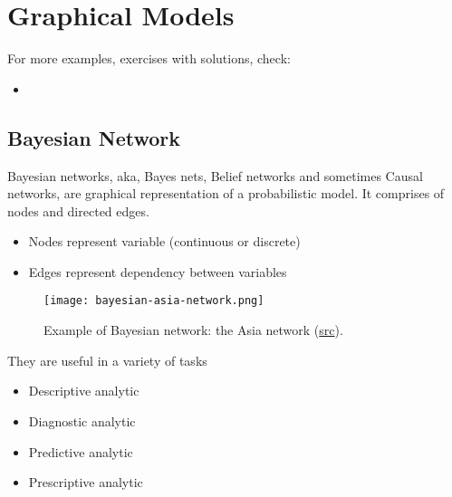 \chapter{Graphical Models}

For more examples, exercises with solutions, check:
\begin{itemize}
	\item {}
\end{itemize}

\section{Bayesian Network}
Bayesian networks, \ac{aka}, Bayes nets, Belief networks and sometimes Causal networks, are graphical representation of a probabilistic model. It comprises of nodes and directed edges.
\begin{itemize}
	\item Nodes represent variable (continuous or discrete)
	\item Edges represent dependency between variables
\end{itemize}

\begin{figure}[hbt!]
	\centering
	\texttt{[image: bayesian-asia-network.png]}
	\caption{Example of Bayesian network: the Asia network (\href{https://www.bayesserver.com/examples/networks/asia}{src}).}
	\label{fig:bayesian-asia-network}
\end{figure}

They are useful in a variety of tasks
\begin{itemize}
	\item Descriptive analytic
	\item Diagnostic analytic
	\item Predictive analytic
	\item Prescriptive analytic
\end{itemize}